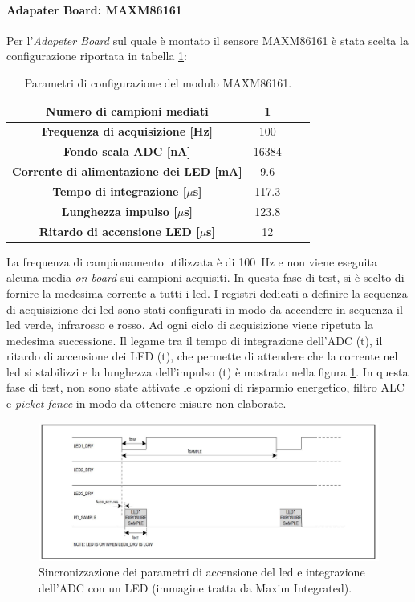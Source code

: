 \paragraph{Adapater Board: MAXM86161}
Per l'\textit{Adapeter Board} sul quale è montato il sensore MAXM86161 è stata scelta la configurazione riportata in tabella \ref{tab:ConfigMAXM86161}:
\begin{table}[b]
	\renewcommand{\arraystretch}{1.5}
	\centering
	\footnotesize
	\begin{tabular}{cccc}
		\textbf{Numero di campioni mediati} & 1 \\ \hline
		\textbf{Frequenza di acquisizione [Hz]} & 100 \\ \hline
		\textbf{Fondo scala ADC [nA]} & 16384 \\ \hline
		\textbf{Corrente di alimentazione dei LED [mA]} & 9.6 \\ \hline
		\textbf{Tempo di integrazione [$\mu$s]} & 117.3 \\ \hline
		\textbf{Lunghezza impulso [$\mu$s]} & 123.8 \\ \hline
		\textbf{Ritardo di accensione LED [$\mu$s]} & 12 \\ \hline
	\end{tabular}
	\caption{Parametri di configurazione del modulo MAXM86161.}
	\label{tab:ConfigMAXM86161}
\end{table}
La frequenza di campionamento utilizzata è di \SI{100}{\hertz} e non viene eseguita alcuna media \textit{on board} sui campioni acquisiti. In questa fase di test, si è scelto di fornire la medesima corrente a tutti i led. I registri dedicati a definire la sequenza di acquisizione dei led sono stati configurati in modo da accendere in sequenza il led verde, infrarosso e rosso. Ad ogni ciclo di acquisizione viene ripetuta la medesima successione. Il legame tra il tempo di integrazione dell'ADC (t), il ritardo di accensione dei LED (t), che permette di attendere che la corrente nel led si stabilizzi e la lunghezza dell'impulso (t) è mostrato nella figura \ref{fig:tempi_maxm}. In questa fase di test, non sono state attivate le opzioni di risparmio energetico, filtro ALC e \textit{picket fence} in modo da ottenere misure non elaborate.

\begin{figure}[t]
	\centering
	\includegraphics[width=1\linewidth]{ImageFiles/Misure Preliminari/tpower_maxm}
	\caption{Sincronizzazione dei parametri di accensione del led e integrazione dell'ADC con un LED (immagine tratta da Maxim Integrated\cite{IntegratedMAXM86161}).}
	\label{fig:tempi_maxm}
\end{figure}

